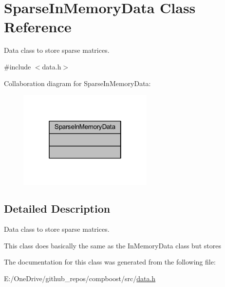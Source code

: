 \hypertarget{class_sparse_in_memory_data}{}\section{Sparse\+In\+Memory\+Data Class Reference}
\label{class_sparse_in_memory_data}


Data class to store sparse matrices.  




{\ttfamily \#include $<$data.\+h$>$}



Collaboration diagram for Sparse\+In\+Memory\+Data\+:
\nopagebreak
\begin{figure}[H]
\begin{center}
\leavevmode
\includegraphics[width=190pt]{class_sparse_in_memory_data__coll__graph}
\end{center}
\end{figure}


\subsection{Detailed Description}
Data class to store sparse matrices. 

This class does basically the same as the {\ttfamily In\+Memory\+Data} class but stores 

The documentation for this class was generated from the following file\+:\begin{DoxyCompactItemize}
\item 
E\+:/\+One\+Drive/github\+\_\+repos/compboost/src/\mbox{\hyperlink{data_8h}{data.\+h}}\end{DoxyCompactItemize}
